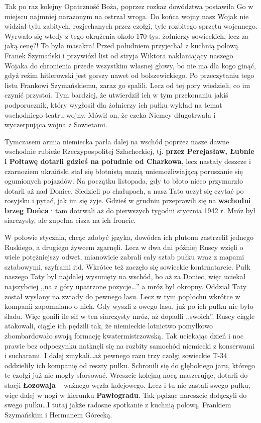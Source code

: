 Tak po raz kolejny Opatrzność Boża, poprzez rozkaz dowództwa postawiła Go w miejscu najmniej narażonym na ostrzał wroga. Do końca wojny nasz Wojak nie widział tylu zabitych, rozjechanych przez czołgi, tyle rozbitego sprzętu wojennego. Wyrwało się wtedy z tego okrążenia około 170 tys. żołnierzy sowieckich, lecz za jaką cenę?! To była masakra! Przed południem przyjechał z kuchnią polową Franek Szymański i przywiózł list od stryja Wiktora nakłaniający naszego Wojaka do chronienia przede wszystkim własnej głowy, bo nie ma dla kogo ginąć, gdyż reżim hitlerowski jest gorszy nawet od bolszewickiego. Po przeczytaniu tego listu Frankowi Szymańskiemu, zaraz go spalili. Lecz od tej pory wiedzieli, co im czynić przystoi. Tym bardziej, że utwierdził ich w tym przekonaniu jakiś podporucznik, który wygłosił dla żołnierzy ich pułku wykład na temat wschodniego teatru wojny. Mówił on, że czeka Niemcy długotrwała i wyczerpująca wojna z Sowietami.

Tymczasem armia niemiecka parła dalej na wschód poprzez nasze dawne wschodnie rubieże Rzeczypospolitej Szlacheckiej, tj. \textbf{przez Perejasław, Łubnie i Połtawę dotarli gdzieś na południe od Charkowa}, lecz nastały deszcze i czarnoziem ukraiński stał się błotnistą mazią uniemożliwiającą poruszanie się ogumionych pojazdów. Na początku listopada, gdy to błoto nieco przymarzło dotarli aż nad Doniec. Siedzieli po chałupach, a nasz Tato uczył się czytać po rosyjsku i pytać, jak im się żyje. Gdzieś w grudniu przeprawili się na \textbf{wschodni brzeg Dońca} i tam dotrwali aż do pierwszych tygodni stycznia 1942 r. Mróz był siarczysty, ale zupełna cisza na ich froncie.

W połowie stycznia, chcąc zdobyć języka, dowódca ich plutonu zastrzelił jednego Ruskiego, a drugiego żywcem zgarnęli. Lecz w dwa dni później Ruscy wzięli o wiele potężniejszy odwet, mianowicie zabrali cały sztab pułku wraz z mapami sztabowymi, szyframi itd. Wkrótce też zaczęło się sowieckie kontrnatarcie. Pułk naszego Taty był najdalej wysunięty na wschód, bo aż za Doniec, więc uciekał najszybciej ,,na z góry upatrzone pozycje\ldots'' a mróz był okropny. Oddział Taty został wysłany na zwiady do pewnego lasu. Lecz w tym popłochu wkrótce w kompanii zapomniano o nich. Gdy wyszli z owego lasu, już po ich pułku nie było śladu. Więc gonili ile sił w ten siarczysty mróz, aż dopadli ,,swoich''. Ruscy ciągle atakowali, ciągle ich pędzili tak, że niemieckie lotnictwo pomyłkowo zbombardowało swoją formację kwatermistrzowską. Tak uciekając dzień i noc prawie bez odpoczynku natknęli się na rozbity samochód niemiecki z konserwami i sucharami. I dalej zmykali\ldots aż pewnego razu trzy czołgi sowieckie T-34 oddzieliły ich kompanię od reszty pułku. Schronili się do głębokiego jaru, którego te czołgi już nie mogły sforsować. Wreszcie kolejną nocą maszerując, dotarli do stacji \textbf{Łozowaja} -- ważnego węzła kolejowego. Lecz i tu nie zastali swego pułku, więc dalej w nogi w kierunku \textbf{Pawłogradu}. Tak pędząc nareszcie dołączyli do swego pułku\ldots I tutaj jakże radosne spotkanie z kuchnią polową, Frankiem Szymańskim i Hermanem Górecką. 

